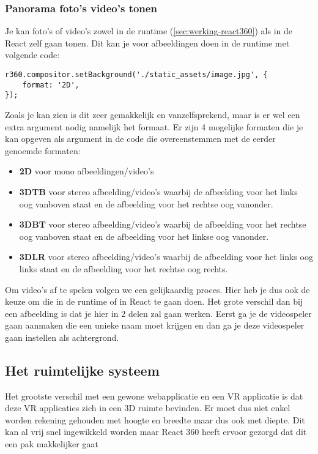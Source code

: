 \subsubsection{Panorama foto's video's tonen}
Je kan foto's of video's zowel in de runtime (\ref{sec:werking-react360}) als in de React zelf gaan tonen. Dit kan je voor afbeeldingen doen in de runtime met volgende code:

\begin{lstlisting}[frame=single, caption=Een afbeelding als achtergrond instellen in de runtime.]
r360.compositor.setBackground('./static_assets/image.jpg', {
	format: '2D',
});
\end{lstlisting}

Zoals je kan zien is dit zeer gemakkelijk en vanzelfsprekend, maar is er wel een extra argument nodig namelijk het formaat. Er zijn 4 mogelijke formaten die je kan opgeven als argument in de code die overeenstemmen met de eerder genoemde formaten:

\begin{itemize}
	\item \textbf{2D} voor mono afbeeldingen/video's 
	\item \textbf{3DTB} voor stereo afbeelding/video's waarbij de afbeelding voor het links oog vanboven staat en de afbeelding voor het rechtse oog vanonder.
	\item \textbf{3DBT} voor stereo afbeelding/video's waarbij de afbeelding voor het rechtse oog vanboven staat en de afbeelding voor het linkse oog vanonder.
	\item \textbf{3DLR} voor stereo afbeelding/video's waarbij de afbeelding voor het links oog links staat en de afbeelding voor het rechtse oog rechts.
\end{itemize}

Om video's af te spelen volgen we een gelijkaardig proces. Hier heb je dus ook de keuze om die in de runtime of in React te gaan doen. Het grote verschil dan bij een afbeelding is dat je hier in 2 delen zal gaan werken. Eerst ga je de videospeler gaan aanmaken die een unieke naam moet krijgen en dan ga je deze videospeler gaan instellen als achtergrond.


\subsection{Het ruimtelijke systeem}
\label{subsec:ruimtelijk-systeem}
Het grootste verschil met een gewone webapplicatie en een VR applicatie is dat deze VR applicaties zich in een 3D ruimte bevinden. Er moet dus niet enkel worden rekening gehouden met hoogte en breedte maar dus ook met diepte. Dit kan al vrij snel ingewikkeld worden maar React 360 heeft ervoor gezorgd dat dit een pak makkelijker gaat

